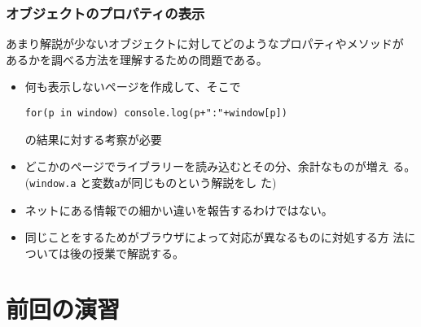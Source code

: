 \begin{frame}[containsverbatim]
 \frametitle{オブジェクトのプロパティの表示}
 あまり解説が少ないオブジェクトに対してどのようなプロパティやメソッドが
 あるかを調べる方法を理解するための問題である。
 \begin{itemize}
	\item 何も表示しないページを作成して、そこで

				\texttt{for(p in window) console.log(p+":"+window[p])}

				の結果に対する考察が必要
	\item どこかのページでライブラリーを読み込むとその分、余計なものが増え
				る。(\texttt{window.a} と変数\texttt{a}が同じものという解説をし
				た)
	\item ネットにある情報での細かい違いを報告するわけではない。
	\item 同じことをするためがブラウザによって対応が異なるものに対処する方
				法については後の授業で解説する。
 \end{itemize}
\end{frame}
\iffalse
\begin{frame}[containsverbatim]
 \frametitle{}
\end{frame}
\begin{frame}[containsverbatim]
 \frametitle{}
\end{frame}
\fi
\section{前回の演習}
